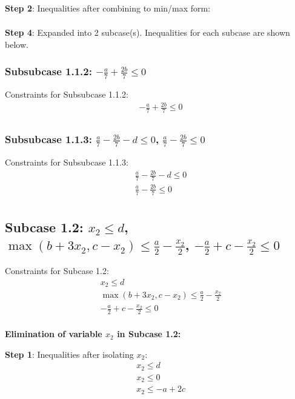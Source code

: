 \documentclass{article}
\begin{document}
\textbf{Step 2}: Inequalities after combining to min/max form:
\begin{align}
\end{align}

\textbf{Step 4}: Expanded into 2 subcase(s). Inequalities for each subcase are shown below.

\subsubsection{Subsubcase 1.1.2: $- \frac{a}{7} + \frac{2 b}{7} \leq 0$}

Constraints for Subsubcase 1.1.2:
\begin{align}
& - \frac{a}{7} + \frac{2 b}{7} \leq 0 \\
\end{align}

\subsubsection{Subsubcase 1.1.3: $\frac{a}{7} - \frac{2 b}{7} - d \leq 0$, $\frac{a}{7} - \frac{2 b}{7} \leq 0$}

Constraints for Subsubcase 1.1.3:
\begin{align}
& \frac{a}{7} - \frac{2 b}{7} - d \leq 0 \\
& \frac{a}{7} - \frac{2 b}{7} \leq 0 \\
\end{align}

\subsection{Subcase 1.2: $x_{2} \leq d$, $\max\left(b + 3 x_{2}, c - x_{2}\right) \leq \frac{a}{2} - \frac{x_{2}}{2}$, $- \frac{a}{2} + c - \frac{x_{2}}{2} \leq 0$}

Constraints for Subcase 1.2:
\begin{align}
& x_{2} \leq d \\
& \max\left(b + 3 x_{2}, c - x_{2}\right) \leq \frac{a}{2} - \frac{x_{2}}{2} \\
& - \frac{a}{2} + c - \frac{x_{2}}{2} \leq 0 \\
\end{align}

\textbf{Elimination of variable $x_{2}$ in Subcase 1.2:}

\textbf{Step 1}: Inequalities after isolating $x_{2}$:
\begin{align}
& x_{2} \leq d \\
& x_{2} \leq 0 \\
& x_{2} \leq - a + 2 c \\
\end{align}
\end{document}
